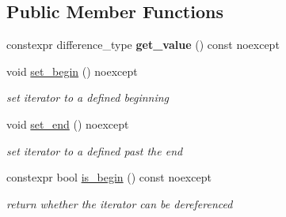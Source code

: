 \subsection*{Public Member Functions}
\begin{DoxyCompactItemize}
\item 
\mbox{\label{classnlohmann_1_1detail_1_1primitive__iterator__t_ae952990886ca1756229f916661a8af81}} 
constexpr difference\+\_\+type {\bfseries get\+\_\+value} () const noexcept
\item 
\mbox{\label{classnlohmann_1_1detail_1_1primitive__iterator__t_a9d9b005906106e12aed738f97d7fee42}} 
void \mbox{\hyperlink{classnlohmann_1_1detail_1_1primitive__iterator__t_a9d9b005906106e12aed738f97d7fee42}{set\+\_\+begin}} () noexcept
\begin{DoxyCompactList}\small\item\em set iterator to a defined beginning \end{DoxyCompactList}\item 
\mbox{\label{classnlohmann_1_1detail_1_1primitive__iterator__t_ad26a823483846a12d890c3feed3097eb}} 
void \mbox{\hyperlink{classnlohmann_1_1detail_1_1primitive__iterator__t_ad26a823483846a12d890c3feed3097eb}{set\+\_\+end}} () noexcept
\begin{DoxyCompactList}\small\item\em set iterator to a defined past the end \end{DoxyCompactList}\item 
\mbox{\label{classnlohmann_1_1detail_1_1primitive__iterator__t_a8d1a7d46b3fcd06edd034f04ededb5e4}} 
constexpr bool \mbox{\hyperlink{classnlohmann_1_1detail_1_1primitive__iterator__t_a8d1a7d46b3fcd06edd034f04ededb5e4}{is\+\_\+begin}} () const noexcept
\begin{DoxyCompactList}\small\item\em return whether the iterator can be dereferenced \end{DoxyCompactList}\item 
\mbox{\label{classnlohmann_1_1detail_1_1primitive__iterator__t_a45a7e301c23b5b90417baf2277f40b1d}} 

\end{DoxyCompactItemize}
